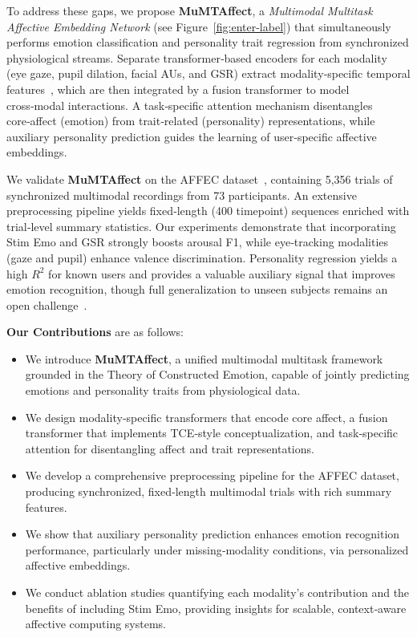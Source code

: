 \documentclass[sigconf]{acmart}
\begin{document}
To address these gaps, we propose \textbf{MuMTAffect}, a \emph{Multimodal Multitask Affective Embedding Network} (see Figure~\ref{fig:enter-label}) that simultaneously performs emotion classification and personality trait regression from synchronized physiological streams. Separate transformer‑based encoders for each modality (eye gaze, pupil dilation, facial AUs, and GSR) extract modality‑specific temporal features~\cite{Vazquez2022,Sawant2023}, which are then integrated by a fusion transformer to model cross‑modal interactions. A task‑specific attention mechanism disentangles core‑affect (emotion) from trait‑related (personality) representations, while auxiliary personality prediction guides the learning of user‑specific affective embeddings.

We validate \textbf{MuMTAffect} on the AFFEC dataset~\cite{j2025affec}, containing 5,356 trials of synchronized multimodal recordings from 73 participants. An extensive preprocessing pipeline yields fixed‑length (400 timepoint) sequences enriched with trial‑level summary statistics. Our experiments demonstrate that incorporating Stim Emo and GSR strongly boosts arousal F1, while eye‑tracking modalities (gaze and pupil) enhance valence discrimination. Personality regression yields a high $R^2$ for known users and provides a valuable auxiliary signal that improves emotion recognition, though full generalization to unseen subjects remains an open challenge~\cite{Yu2021}.

\textbf{Our Contributions} are as follows:
\begin{itemize}
  \item We introduce \textbf{MuMTAffect}, a unified multimodal multitask framework grounded in the Theory of Constructed Emotion, capable of jointly predicting emotions and personality traits from physiological data.
  \item We design modality‑specific transformers that encode core affect, a fusion transformer that implements TCE‑style conceptualization, and task‑specific attention for disentangling affect and trait representations.
  \item We develop a comprehensive preprocessing pipeline for the AFFEC dataset, producing synchronized, fixed‑length multimodal trials with rich summary features.
  \item We show that auxiliary personality prediction enhances emotion recognition performance, particularly under missing‑modality conditions, via personalized affective embeddings.
  \item We conduct ablation studies quantifying each modality’s contribution and the benefits of including Stim Emo, providing insights for scalable, context‑aware affective computing systems.
\end{itemize}
\end{document}
